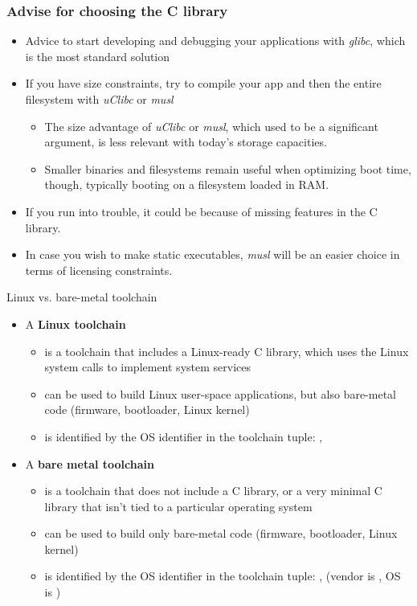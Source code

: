 \begin{frame}
  \frametitle{Advise for choosing the C library}
  \begin{itemize}
  \item Advice to start developing and debugging your applications
    with {\em glibc}, which is the most standard solution
  \item If you have size constraints, try to compile your app and then
    the entire filesystem with {\em uClibc} or {\em musl}
    \begin{itemize}
    \item The size advantage of {\em uClibc} or {\em musl}, which used
      to be a significant argument, is less relevant with today's
      storage capacities.
    \item Smaller binaries and filesystems remain useful when optimizing
      boot time, though, typically booting on a filesystem loaded in RAM.
    \end{itemize}
  \item If you run into trouble, it could be because of missing
    features in the C library.
  \item In case you wish to make static executables, {\em musl} will
    be an easier choice in terms of licensing constraints.
  \end{itemize}
\end{frame}

\begin{frame}{Linux vs. bare-metal toolchain}
  \begin{itemize}
  \item A {\bf Linux toolchain}
    \begin{itemize}
    \item is a toolchain that includes a Linux-ready C library, which
      uses the Linux system calls to implement system services
    \item can be used to build Linux user-space applications, but also
      bare-metal code (firmware, bootloader, Linux kernel)
    \item is identified by the  OS identifier in the
      toolchain tuple: ,
    \end{itemize}
  \item A {\bf bare metal toolchain}
    \begin{itemize}
    \item is a toolchain that does not include a C library, or a very
      minimal C library that isn't tied to a particular operating
      system
    \item can be used to build only bare-metal code (firmware,
      bootloader, Linux kernel)
    \item is identified by the  OS identifier in the
      toolchain tuple: , 
      (vendor is , OS is )
    \end{itemize}
  \end{itemize}
\end{frame}

